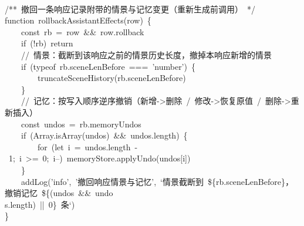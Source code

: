\documentclass[a4paper,10pt]{article}
\begin{document}
{\mbox{}\\
/**~撤回一条响应记录附带的情景与记忆变更（重新生成前调用）~*/\\
function~rollbackAssistantEffects(row)~\{\\
~~~~const~rb~=~row~\&\&~row.rollback\\
~~~~if~(!rb)~return\\
~~~~//~情景：截断到该响应之前的情景历史长度，撤掉本响应新增的情景\\
~~~~if~(typeof~rb.sceneLenBefore~===~'number')~\{\\
~~~~~~~~truncateSceneHistory(rb.sceneLenBefore)\\
~~~~\}\\
~~~~//~记忆：按写入顺序逆序撤销（新增->删除~/~修改->恢复原值~/~删除->重新插入）\\
~~~~const~undos~=~rb.memoryUndos\\
~~~~if~(Array.isArray(undos)~\&\&~undos.length)~\{\\
~~~~~~~~for~(let~i~=~undos.length~-~1;~i~>=~0;~i--)~memoryStore.applyUndo(undos[i])\\
~~~~\}\\
~~~~addLog('info',~'撤回响应情景与记忆',~`情景截断到~\$\{rb.sceneLenBefore\}，撤销记忆~\$\{(undos~\&\&~undo\\
s.length)~||~0\}~条`)\\
\}\\
\mbox{}
}

\newpage
\end{document}
